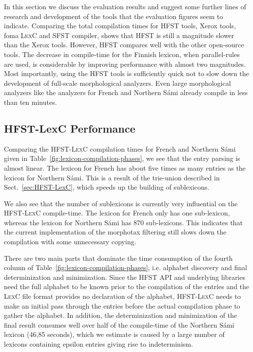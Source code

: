 \documentclass[postprint]{flammie}
\begin{document}
In this section we discuss the evaluation results and suggest some
further lines of research and development of the tools that the
evaluation figures seem to indicate. Comparing the total compilation
times for \textsc{HFST} tools, Xerox tools, foma \textsc{LexC} and
\textsc{SFST} compiler, shows that \textsc{HFST} is still a magnitude
slower than the Xerox tools. However, \textsc{HFST} compares well with
the other open-source tools. The decrease in compile-time for the
Finnish lexicon, when parallel-rules are used, is considerable by
improving performance with almost two magnitudes. Most importantly,
using the \textsc{HFST} tools is sufficiently quick not to slow down
the development of full-scale morphological analyzers. Even large
morphological analyzers like the analyzers for French and Northern
S\'ami already compile in less than ten minutes.

\subsection{HFST-LexC Performance} 

Comparing the \textsc{HFST-LexC} compilation times for French and
Northern S\'ami given in Table~\ref{fig:lexicon-compilation-phases},
we see that the entry parsing is almost linear. The lexicon for French
has about five times as many entries as the lexicon for Northern
S\'ami. This is a result of the trie-union described in
Sect.~\ref{sec:HFST-LexC}, which speeds up the building of
sublexicons.

We also see that the number of sublexicons is currently very
influential on the \textsc{HFST-LexC} compile-time. The lexicon for
French only has one sub-lexicon, whereas the lexicon for Northern
S\'ami has 870 sub-lexicons. This indicates that the current
implementation of the morphotax filtering still slows down the
compilation with some unnecessary copying.

There are two main parts that dominate the time consumption of the
fourth column of Table~\ref{fig:lexicon-compilation-phases},
i.e. alphabet discovery and final determinization and minimization.
Since the \textsc{HFST} API and underlying libraries need the full
alphabet to be known prior to the compilation of the entries and the
\textsc{LexC} file format provides no declaration of the alphabet,
\textsc{HFST-LexC} needs to make an initial pass through the entries
before the actual compilation phase to gather the alphabet.  In
addition, the determinization and minimization of the final result
consumes well over half of the compile-time of the Northern S\'ami
lexicon (46,85 seconds), which we estimate is caused by a large number
of lexicons containing epsilon entries giving rise to indeterminism.
\end{document}
